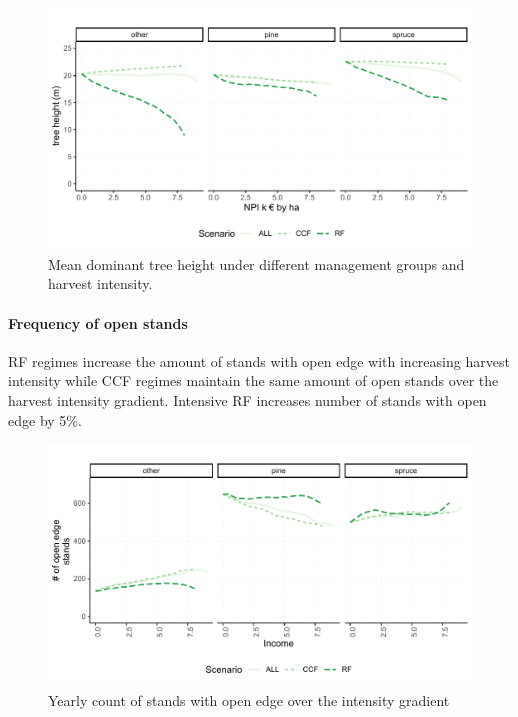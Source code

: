 \documentclass[]{elsarticle} %
\makeatletter
\def\maxwidth{\ifdim\Gin@nat@width>\linewidth\linewidth
\else\Gin@nat@width\fi}
\let\Oldincludegraphics\includegraphics
\renewcommand{\includegraphics}[1]{\Oldincludegraphics[width=\maxwidth]{#1}}
\makeatother
\begin{document}
\begin{figure}
\centering
\includegraphics{test_manus_files/figure-latex/res_D_tree_height-1.pdf}
\caption{Mean dominant tree height under different management groups and
harvest intensity.}
\end{figure}

\paragraph{Frequency of open stands}\label{frequency-of-open-stands}

RF regimes increase the amount of stands with open edge with increasing
harvest intensity while CCF regimes maintain the same amount of open
stands over the harvest intensity gradient. Intensive RF increases
number of stands with open edge by 5\%.

\begin{figure}
\centering
\includegraphics{test_manus_files/figure-latex/fig_6_count_open_edge-1.pdf}
\caption{Yearly count of stands with open edge over the intensity
gradient}
\end{figure}
\end{document}
